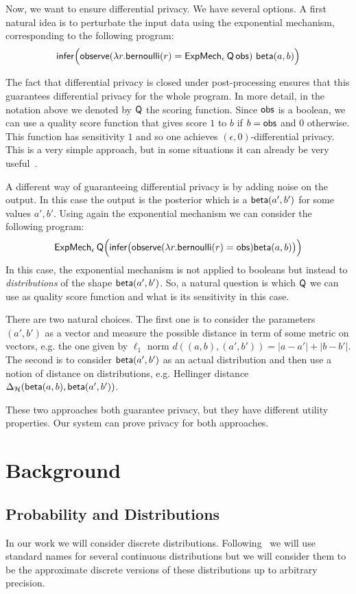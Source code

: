 \documentclass{sig-alternate-05-2015}
\theoremstyle{plain}
\theoremstyle{definition}
\theoremstyle{corollary}
\begin{document}
Now, we want to ensure differential privacy. We have several options.
A first natural idea is to perturbate the input data using
the exponential mechanism, corresponding to the following program:
$$
{\sf infer}\Big ( {\sf observe} (\lambda r. {\sf bernoulli}(r)={\sf
  ExpMech_\epsilon\, Q\, obs})\ {\sf beta}(a,b)\Big )
$$

The fact that differential privacy is closed under post-processing ensures that
this guarantees differential privacy for the whole program. In more detail, in
the notation above we denoted by ${\sf Q}$ the scoring function. Since ${\sf
  obs}$ is a boolean, we can use a quality score function that gives score $1$
to $b$ if $b={\sf obs}$ and $0$ otherwise. This function has sensitivity $1$ and
so one achieves $(\epsilon,0)$-differential privacy.  This is a very simple
approach, but in some situations it can already be very
useful~\citep{DBLP:conf/nips/WilliamsM10}.

A different way of guaranteeing differential privacy is by adding noise on the
output. In this case the output is the posterior which is a ${\sf
  beta}(a',b')$ for some values $a',b'$. Using again the exponential
mechanism we can consider the following program:
$$
{\sf   ExpMech_\epsilon\, Q}\Big ({\sf infer}\big ( {\sf observe} (\lambda
r. {\sf bernoulli}(r)
={\sf
 obs}) {\sf beta}(a,b)\big )\Big )
$$
In this case, the exponential mechanism is not applied to booleans but instead
to \emph{distributions} of the shape ${\sf  beta}(a',b')$. So, a natural
question is which $\sf Q$ we can use as quality score function and what is its
sensitivity in this case. 

There are two natural choices. The first one is to consider the parameters
$(a',b')$ as a vector and measure the possible distance in term of some metric
on vectors, e.g. the one given by $\ell_1$ norm
$d((a,b),(a',b'))=|a-a'|+|b-b'|$. The second is to consider ${\sf  beta}(a',b')$
as an actual distribution and then use a notion of distance on distributions,
e.g. Hellinger distance $\Delta_{\mathcal{H}}({\sf  beta}(a,b),{\sf
  beta}(a',b'))$.

These two approaches both guarantee privacy, but they have different utility
properties. Our system \THESYSTEM can prove privacy for both approaches.

\section{Background}
\label{sec:background}
\subsection{Probability and Distributions}
In our work we will consider discrete distributions.
Following~\citet{DBLP:journals/fttcs/DworkR14} we will use standard names for
several continuous distributions but we will consider them to be the approximate
discrete versions of these distributions up to arbitrary precision.
\end{document}
